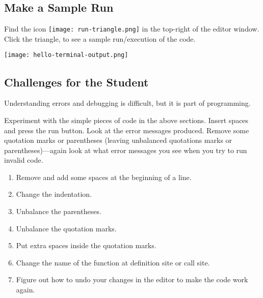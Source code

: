 \subsection{Make a Sample Run}

Find the icon \texttt{[image: run-triangle.png]}
  in the top-right of the editor window.  Click the triangle, to see a sample run/execution of the code.

\noindent\texttt{[image: hello-terminal-output.png]}


\subsection{Challenges for the Student}

Understanding errors and debugging is difficult, but it is part of programming.

Experiment with the simple pieces of code in the above sections.
Insert spaces and press the run button.  Look at the error messages
produced. Remove some quotation marks or parentheses (leaving
unbalanced quotations marks or parentheses)---again look at what error
messages you see when you try to run invalid code.


\begin{enumerate}
\item Remove and add some spaces at the beginning of a line.
\item Change the indentation.
\item Unbalance the parentheses.
\item Unbalance the quotation marks.
\item Put extra spaces inside the quotation marks.
\item Change the name of the  function at definition site or call site.
\item Figure out how to undo your changes in the editor to make the code work again.
\end{enumerate}

\clearpage

